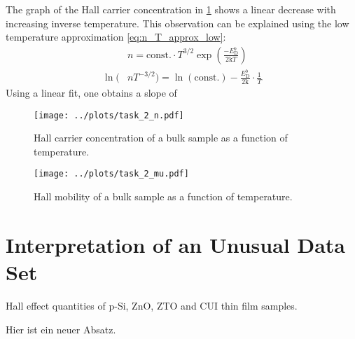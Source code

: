 The graph of the Hall carrier concentration in \cref{fig:zno_hall_effect_n} shows a linear decrease with increasing inverse temperature. 
This observation can be explained using the low temperature approximation \cref{eq:n_T_approx_low}:
\begin{align}
	&n = \text{const.} \cdot T^{3/2} \exp\left( \frac{-E_{\mathrm{D}}^{b}}{2 \mathrm{k}T} \right) \\
	\ln(&n T^{-3/2}) = \ln(\text{const.}) - \frac{E_{\mathrm{D}}^{b}}{2 \mathrm{k}} \cdot \frac{1}{T}
\end{align}
Using a linear fit, one obtains a slope of 

\begin{figure}
	\centering
	\texttt{[image: ../plots/task\_2\_n.pdf]}
	\caption{Hall carrier concentration of a bulk  sample as a function of temperature.}
	\label{fig:zno_hall_effect_n}
\end{figure}
\begin{figure}
	\centering
	\texttt{[image: ../plots/task\_2\_mu.pdf]}
	\caption{Hall mobility of a bulk  sample as a function of temperature.}
	\label{fig:zno_hall_effect_mu}
\end{figure}

\section{Interpretation of an Unusual Data Set}


\begin{table*}
\centering

\caption{Hall effect quantities of p-Si, ZnO, ZTO and CUI thin film samples.}
\label{tab:hall_results_detail}
\end{table*}

Hier ist ein neuer Absatz.